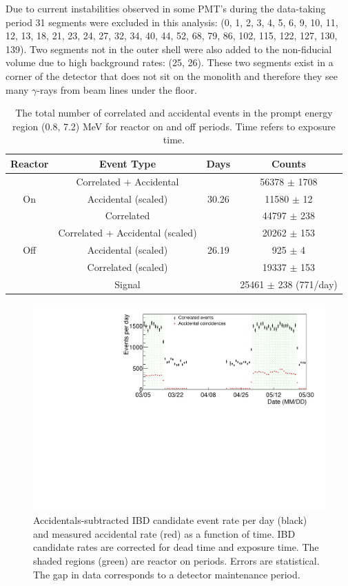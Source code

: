 Due to current instabilities observed in some PMT's during the data-taking period 31 segments were excluded in this analysis: (0, 1, 2, 3, 4, 5, 6, 9, 10, 11, 12, 13, 18, 21, 23, 24, 27, 32, 34, 40, 44, 52, 68, 79, 86, 102, 115, 122, 127, 130, 139).
Two segments not in the outer shell were also added to the non-fiducial volume due to high background rates: (25, 26).
These two segments exist in a corner of the detector that does not sit on the monolith and therefore they see many $\gamma$-rays from beam lines under the floor.

\begin{table}[H]
\begin{tabular}{|c|c|c|c|}
	\hline 
	\textbf{Reactor} & \textbf{Event Type} & \textbf{Days} & \textbf{Counts} \\ 
	\hline 
	& Correlated + Accidental &  & 56378 $\pm$ 1708 \\ 
	On & Accidental (scaled) & 30.26 & 11580 $\pm$ 12 \\ 
	& Correlated &  & 44797 $\pm$ 238 \\ 
	\hline 
	& Correlated + Accidental (scaled) & & 20262 $\pm$ 153   \\ 
	Off &  Accidental (scaled) & 26.19  & 925 $\pm$ 4   \\ 
	& Correlated (scaled) & & 19337 $\pm$ 153 \\ 
	\hline 
	\hline 
	& Signal &  & 25461 $\pm$ 238 (771/day) \\ 
	\hline 
\end{tabular} 
\caption{The total number of correlated and accidental events in the prompt energy region (0.8, 7.2) MeV for reactor on and off periods. Time refers to exposure time.}
\label{tab:datastats}
\end{table}

\begin{figure}[H]
	\centering
	\includegraphics[width=0.9\linewidth]{tex/7-oscillation-images/EvtRates}
	\caption{Accidentals-subtracted IBD candidate event rate per day (black) and measured accidental rate (red) as a function of time. IBD candidate rates are corrected for dead time and exposure time. The shaded regions (green) are reactor on periods. Errors are statistical. The gap in data corresponds to a detector maintenance period.}
	\label{fig:evtrates}
\end{figure}


